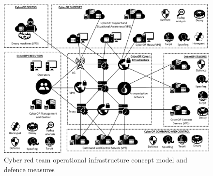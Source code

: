 \begin{figure}[!htb]
    \centering
    \includegraphics[width=1.0\textwidth]{./img/crt_infra.jpg}
    \caption{Cyber red team operational infrastructure concept model and defence measures}
    \label{fig:rtinfra}
\end{figure}

